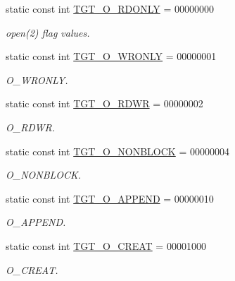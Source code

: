 \begin{Indent}{\bf }\par
{\em \label{_amgrpd41d8cd98f00b204e9800998ecf8427e}
 }\begin{DoxyCompactItemize}
\item 
static const int \hyperlink{classAlphaLinux_ad266b23a0ae07d1833e18bae651f3411}{TGT\_\-O\_\-RDONLY} = 00000000
\begin{DoxyCompactList}\small\item\em open(2) flag values. \item\end{DoxyCompactList}\item 
static const int \hyperlink{classAlphaLinux_a6156c069cefe05ce3cce033b2e0c2de2}{TGT\_\-O\_\-WRONLY} = 00000001
\begin{DoxyCompactList}\small\item\em O\_\-WRONLY. \item\end{DoxyCompactList}\item 
static const int \hyperlink{classAlphaLinux_ac6fa9ecf5d2f3314f197698f1099e2ac}{TGT\_\-O\_\-RDWR} = 00000002
\begin{DoxyCompactList}\small\item\em O\_\-RDWR. \item\end{DoxyCompactList}\item 
static const int \hyperlink{classAlphaLinux_a0ea5420b4c9b45ba342a266fb77ac942}{TGT\_\-O\_\-NONBLOCK} = 00000004
\begin{DoxyCompactList}\small\item\em O\_\-NONBLOCK. \item\end{DoxyCompactList}\item 
static const int \hyperlink{classAlphaLinux_af11adc5404ea3780a5ce2829cc3710b7}{TGT\_\-O\_\-APPEND} = 00000010
\begin{DoxyCompactList}\small\item\em O\_\-APPEND. \item\end{DoxyCompactList}\item 
static const int \hyperlink{classAlphaLinux_aec02e04ca367e6c3f4b46e4edc12efac}{TGT\_\-O\_\-CREAT} = 00001000
\begin{DoxyCompactList}\small\item\em O\_\-CREAT. \item\end{DoxyCompactList}\item 

\end{DoxyCompactItemize}
\end{Indent}
